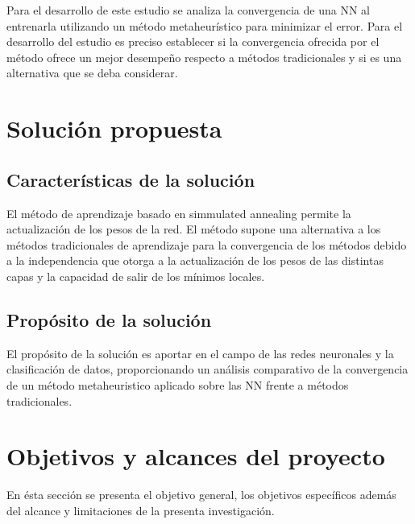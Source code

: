 Para el desarrollo de este estudio se analiza la convergencia de una NN al entrenarla utilizando un método metaheurístico para minimizar el error. Para el desarrollo del estudio es preciso establecer si la convergencia ofrecida por el método ofrece un mejor desempeño respecto a métodos tradicionales y si es una alternativa que se deba considerar.




\section{Solución propuesta}
\subsection{Características de la solución}
El método de aprendizaje basado en simmulated annealing permite la actualización de los pesos de la red. El método supone una alternativa a los métodos tradicionales de aprendizaje para la convergencia de los métodos debido a la independencia que otorga a la actualización de los pesos de las distintas capas y la capacidad de salir de los mínimos locales.

\subsection{Propósito de la solución}
El propósito de la solución es aportar en el campo de las redes neuronales y la clasificación de datos, proporcionando un análisis comparativo de la convergencia de un método metaheuristico aplicado sobre las NN frente a métodos tradicionales.

\section{Objetivos y alcances del proyecto}
En ésta sección se presenta el objetivo general, los objetivos específicos además del alcance y limitaciones de la presenta investigación.

